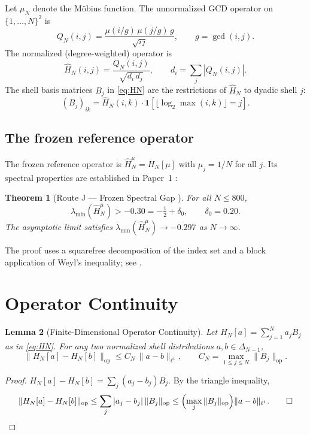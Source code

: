 \documentclass[12pt]{amsart}
\newtheorem{theorem}{Theorem}[section]
\newtheorem{lemma}[theorem]{Lemma}
\theoremstyle{definition}
\newcommand{\HN}{\widehat{H}_N^\mu}
\newcommand{\lmin}{\lambda_{\min}}
\begin{document}
Let $\mu_N$ denote the Möbius function. The unnormalized GCD
operator on $\{1,\dots,N\}^2$ is
\[
Q_N(i,j) = \frac{\mu(i/g)\,\mu(j/g)\,g}{\sqrt{ij}},
\qquad g=\gcd(i,j).
\]
The normalized (degree-weighted) operator is
\[
\widehat H_N(i,j) = \frac{Q_N(i,j)}{\sqrt{d_i\,d_j}},
\qquad d_i = \sum_j |Q_N(i,j)|.
\]
The shell basis matrices $B_j$ in \eqref{eq:HN} are the restrictions
of $\widehat H_N$ to dyadic shell $j$:
\[
(B_j)_{ik} = \widehat H_N(i,k)\cdot
\mathbf{1}[\lfloor\log_2\max(i,k)\rfloor = j].
\]

\subsection{The frozen reference operator}

The frozen reference operator is $\HN = H_N[\mu]$ with
$\mu_j=1/N$ for all $j$. Its spectral properties are established
in Paper~1 \cite{Simons2026a}:

\begin{theorem}[Route J — Frozen Spectral Gap {\cite{Simons2026a}}]
\label{thm:routeJ}
For all $N\le 800$,
\[
\lmin(\HN) > -0.30 = -\tfrac{1}{2}+\delta_0,
\qquad \delta_0=0.20.
\]
The asymptotic limit satisfies $\lmin(\HN)\to-0.297$ as $N\to\infty$.
\end{theorem}

\noindent
The proof uses a squarefree decomposition of the index set and
a block application of Weyl's inequality; see \cite{Simons2026a}.

\section{Operator Continuity}
\label{sec:lipschitz}

\begin{tcolorbox}[provedbox]
\begin{lemma}[Finite-Dimensional Operator Continuity]
\label{lem:continuity}
Let $H_N[a]=\sum_{j=1}^N a_j B_j$ as in \eqref{eq:HN}.
For any two normalized shell distributions $a,b\in\Delta_{N-1}$,
\[
\|H_N[a]-H_N[b]\|_{\mathrm{op}}
\le C_N\,\|a-b\|_{\ell^1},
\qquad
C_N = \max_{1\le j\le N}\|B_j\|_{\mathrm{op}}.
\]
\end{lemma}

\begin{proof}
$H_N[a]-H_N[b]=\sum_j(a_j-b_j)B_j$.
By the triangle inequality,
\[
\|H_N[a]-H_N[b]\|_{\mathrm{op}}
\le\sum_j|a_j-b_j|\,\|B_j\|_{\mathrm{op}}
\le\Bigl(\max_j\|B_j\|_{\mathrm{op}}\Bigr)\|a-b\|_{\ell^1}.\qquad\square
\]
\end{proof}
\end{tcolorbox}
\end{document}
